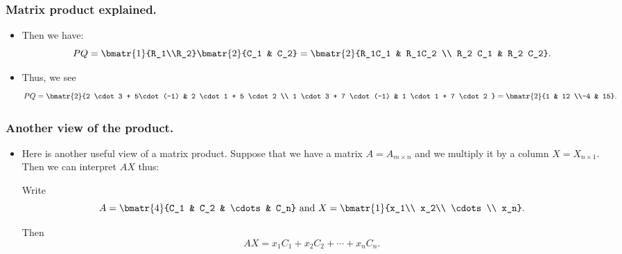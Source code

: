 
\begin{frame}%
  \frametitle{Matrix product explained.}
  \begin{itemize}%
 
\item Then we have:
$$PQ =\bmatr{1}{R_1\\R_2} \bmatr{2}{C_1 & C_2}
=\bmatr{2}{R_1C_1 & R_1C_2 \\ R_2 C_1 & R_2 C_2}.$$

\item Thus, we see
$$PQ 
= \bmatr{2}{2 \cdot 3 + 5\cdot (-1) & 2 \cdot 1 + 5 \cdot 2 \\
                 1 \cdot 3 + 7 \cdot (-1) & 1 \cdot 1 + 7 \cdot 2 }
     = \bmatr{2}{1 & 12 \\-4 & 15}.$$


\end{itemize}
\end{frame}


\begin{frame}%
  \frametitle{Another view of the product.}
  \begin{itemize}%
 
\item Here is another useful view of a matrix product. Suppose that we
have a matrix $A=A_{m\times n}$ and we multiply it by a column
$X=X_{n\times 1}$. Then we can interpret $AX$ thus:

Write
$$A=\bmatr{4}{C_1 & C_2 & \cdots & C_n} \mbox{ and }
 X = \bmatr{1}{x_1\\ x_2\\ \cdots \\ x_n}.$$

Then $$AX=x_1 C_1 + x_2 C_2 + \cdots + x_n C_n.$$

\end{itemize}
\end{frame}


